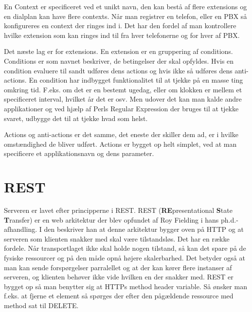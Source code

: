 En Context er specificeret ved et unikt navn, den kan bestå af flere extensions og en dialplan kan have flere contexts. Når man registrer en telefon, eller en PBX så konfigureres en context der ringes ind i. Det har den fordel af man kontrollere hvilke extension som kan ringes ind til fra hver telefonerne og for hver af PBX.

Det næste lag er for extensions. En extension er en gruppering af conditions.
Conditions er som navnet beskriver, de betingelser der skal opfyldes. 
Hvis en condition evaluere til sandt udføres dens actions og hvis ikke så udføres dens anti-actions.
En condition har indbygget funktionalitet til at tjekke på en masse ting omkring tid. F.eks. om det er en bestemt ugedag, eller om klokken er mellem et specificeret interval, hvilket år det er osv. Men udover det kan man kalde andre applikationer og ved hjælp af Perls Regular Expression der bruges til at tjekke svaret, udbygge det til at tjekke hvad som helst. 

Actions og anti-actions er det samme, det eneste der skiller dem ad, er i hvilke omstændighed de bliver udført. Actions er bygget op helt simplet, ved at man specificere et applikationsnavn og dens parameter.

\section{REST}
Serveren er lavet efter principperne i REST.
REST (\textbf{RE}presentational \textbf{S}tate \textbf{T}ransfer) er en web arkitektur der blev opfundet af Roy Fielding i hans ph.d.-afhandling. I den beskriver han at denne arkitektur bygger oven på HTTP og at serveren som klienten snakker med skal være tilstandsløs. Det har en række fordele. Når transportlaget ikke skal holde nogen tilstand, så kan det spare på de fysiske ressourcer og på den måde opnå højere skalerbarhed. Det betyder også at man kan sende forspørgelser parralellet og at der kan kører flere instanser af serveren, og klienten behøver ikke vide hvilken en der snakker med.
REST er bygget op så man benytter sig at HTTPs method header variable. Så ønsker man f.eks. at fjerne et element så spørges der efter den pågældende ressource med method sat til DELETE.

















